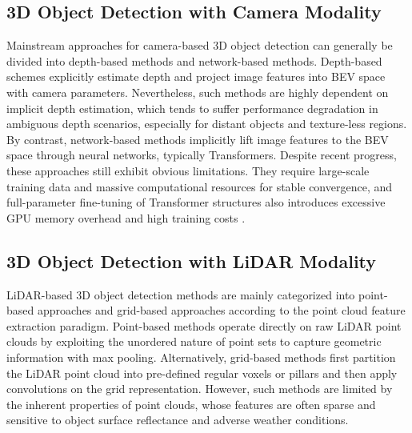 \documentclass[letterpaper, 10 pt, conference]{ieeeconf}  %
\begin{document}
\subsection{3D Object Detection with Camera Modality}
Mainstream approaches for camera-based 3D object detection can generally be divided into depth-based methods and network-based methods. Depth-based schemes \cite{li2023bevdepth,philion2020lift,lu2025toward} explicitly estimate depth and project image features into BEV space with camera parameters. Nevertheless, such methods are highly dependent on implicit depth estimation, which tends to suffer performance degradation in ambiguous depth scenarios, especially for distant objects and texture-less regions.
By contrast, network-based methods \cite{li2024bevformer,yang2023bevformer,jiang2023polarformer} implicitly lift image features to the BEV space through neural networks, typically Transformers. Despite recent progress, these approaches still exhibit obvious limitations. They require large-scale training data and massive computational resources for stable convergence, and full-parameter fine-tuning of Transformer structures also introduces excessive GPU memory overhead and high training costs \cite{yin20255}.

\subsection{3D Object Detection with LiDAR Modality} 
LiDAR-based 3D object detection methods are mainly categorized into point-based approaches and grid-based approaches according to the point cloud feature extraction paradigm. Point-based methods \cite{qi2017pointnet,qi2017pointnet++,ding2019votenet} operate directly on raw LiDAR point clouds by exploiting the unordered nature of point sets to capture geometric information with max pooling. Alternatively, grid-based methods \cite{zhou2018voxelnet,lang2019pointpillars,yan2018second} first partition the LiDAR point cloud into pre-defined regular voxels or pillars and then apply convolutions on the grid representation. However, such methods are limited by the inherent properties of point clouds, whose features are often sparse and sensitive to object surface reflectance and adverse weather conditions.

\end{document}
